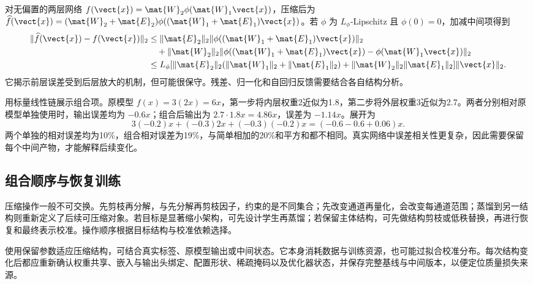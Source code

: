 \documentclass[../textbook.tex]{subfiles}
\begin{document}
\begin{example}[组合压缩的误差传播]


对无偏置的两层网络 $f(\vect{x})=\mat{W}_2\phi(\mat{W}_1\vect{x})$，压缩后为 $\widehat f(\vect{x})=(\mat{W}_2+\mat{E}_2)\phi((\mat{W}_1+\mat{E}_1)\vect{x})$。若 $\phi$ 为 $L_\phi$-Lipschitz 且 $\phi(0)=0$，加减中间项得到
\begin{align*}
 \|\widehat f(\vect{x})-f(\vect{x})\|_2
 &\leq\|\mat{E}_2\|_2\|\phi((\mat{W}_1+\mat{E}_1)\vect{x})\|_2\\
 &\quad+\|\mat{W}_2\|_2\|\phi((\mat{W}_1+\mat{E}_1)\vect{x})-\phi(\mat{W}_1\vect{x})\|_2\\
 &\leq L_\phi[\|\mat{E}_2\|_2(\|\mat{W}_1\|_2+\|\mat{E}_1\|_2)
 +\|\mat{W}_2\|_2\|\mat{E}_1\|_2]\|\vect{x}\|_2.
\end{align*}
它揭示前层误差受到后层放大的机制，但可能很保守。残差、归一化和自回归反馈需要结合各自结构分析。

用标量线性链展示组合项。原模型 $f(x)=3(2x)=6x$，第一步将内层权重2近似为1.8，第二步将外层权重3近似为2.7。两者分别相对原模型单独使用时，输出误差均为 $-0.6x$；组合后输出为 $2.7\cdot1.8x=4.86x$，误差为 $-1.14x$。展开为
\begin{equation*}
 3(-0.2)x+(-0.3)2x+(-0.3)(-0.2)x
 =(-0.6-0.6+0.06)x.
\end{equation*}
两个单独的相对误差均为10\%，组合相对误差为19\%，与简单相加的20\%和平方和都不相同。真实网络中误差相关性更复杂，因此需要保留每个中间产物，才能解释后续变化。
\end{example}

\subsection{组合顺序与恢复训练}
压缩操作一般不可交换。先剪枝再分解，与先分解再剪枝因子，约束的是不同集合；先改变通道再量化，会改变每通道范围；蒸馏到另一结构则重新定义了后续可压缩对象。若目标是显著缩小架构，可先设计学生再蒸馏；若保留主体结构，可先做结构剪枝或低秩替换，再进行恢复和最终表示校准。操作顺序根据目标结构与校准依赖选择。

使用保留参数适应压缩结构，可结合真实标签、原模型输出或中间状态。它本身消耗数据与训练资源，也可能过拟合校准分布。每次结构变化后都应重新确认权重共享、嵌入与输出头绑定、配置形状、稀疏掩码以及优化器状态，并保存完整基线与中间版本，以便定位质量损失来源。
\end{document}
